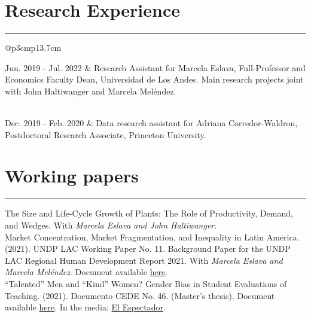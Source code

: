 \documentclass[12pt, letterpaper]{article}
\begin{document}
\section*{Research Experience}
\vspace*{-8mm}
\noindent \rule{\linewidth}{0.2mm}
\noindent
\begin{tabular}{@{}p{3cm}p{13.7cm}}
\raggedright{Jun. 2019 - Jul. 2022} &  Research Assistant for Marcela Eslava, Full-Professor and Economics Faculty Dean, Universidad de Los Andes. Main research projects joint with John Haltiwanger and Marcela Meléndez.  \\ 
\\ [-3mm]
\raggedright{Dec. 2019 - \newline Feb. 2020} & Data research assistant for Adriana Corredor-Waldron, Postdoctoral Research Associate, Princeton University.
\end{tabular}

\vspace*{-2mm}

\section*{Working papers}
\vspace*{-8mm}
\noindent \rule{\linewidth}{0.2mm}
\noindent The Size and Life-Cycle Growth of Plants: The Role of Productivity, Demand, and Wedges.  With \textit{Marcela Eslava and John Haltiwanger}. \\ [-3mm] %

\noindent Market Concentration, Market Fragmentation, and Inequality in Latin America. (2021). UNDP LAC Working Paper No. 11. Background Paper for the UNDP LAC Regional Human Development Report 2021.  With \textit{Marcela Eslava and Marcela Meléndez}. Document available \href{https://www.latinamerica.undp.org/content/rblac/en/home/library/poverty/market-concentration--market-fragmentation--and-inequality-in-la.html}{here}. \\ [-3mm]

\noindent ``Talented'' Men and ``Kind'' Women? Gender Bias in Student Evaluations of Teaching. (2021). Documento CEDE No. 46. (Master's thesis). Document available \href{https://papers.ssrn.com/sol3/papers.cfm?abstract_id=3919797}{here}. In the media: \href{https://www.elespectador.com/educacion/los-profes-crack-y-las-profes-amables-el-sesgo-de-genero-en-las-aulas/}{El Espectador}.
\end{document}
